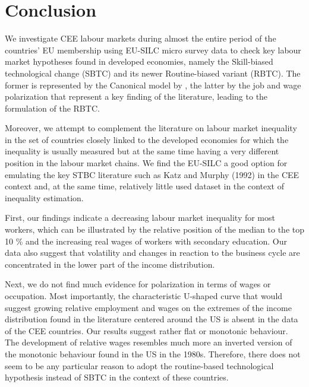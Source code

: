 \documentclass[11pt]{article}
\begin{document}

\section{Conclusion}
We investigate CEE labour markets during almost the entire period of the countries' EU membership using EU-SILC micro survey data to check key labour market hypotheses found in developed economies, namely the Skill-biased technological change (SBTC) and its newer Routine-biased variant (RBTC). The former is represented by the Canonical model by \citet{katz1992changes}, the latter by the job and wage polarization that represent a key finding of the literature, leading to the formulation of the RBTC.

Moreover, we attempt to complement the literature on labour market inequality in the set of countries closely linked to the developed economies for which the inequality is usually measured but at the same time having a very different position in the labour market chains. We find the EU-SILC a good option for emulating the key STBC literature such as Katz and Murphy (1992) in the CEE context and, at the same time, relatively little used dataset in the context of inequality estimation.

First, our findings indicate a decreasing labour market inequality for most workers, which can be illustrated by the relative position of the median to the top 10 \% and the increasing real wages of workers with secondary education. Our data also suggest that volatility and changes in reaction to the business cycle are concentrated in the lower part of the income distribution.

Next, we do not find much evidence for polarization in terms of wages or occupation. Most importantly, the characteristic U-shaped curve that would suggest growing relative employment and wages on the extremes of the income distribution found in the literature centered around the US is absent in the data of the CEE countries. Our results suggest rather flat or monotonic behaviour. The development of relative wages resembles much more an inverted version of the monotonic behaviour found in the US in the 1980s. Therefore, there does not seem to be any particular reason to adopt the routine-based technological hypothesis instead of SBTC in the context of these countries.
\end{document}

